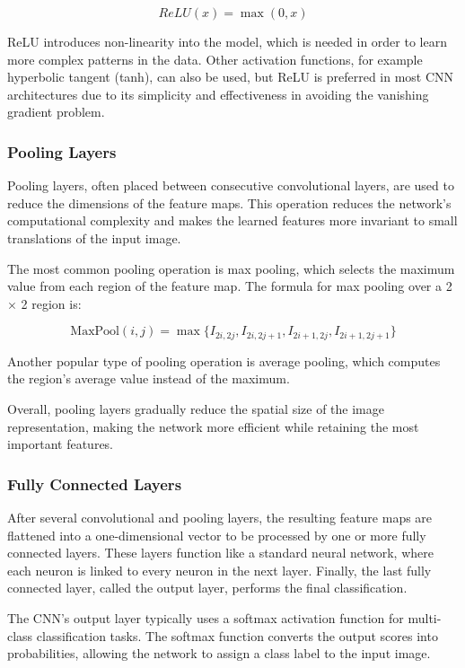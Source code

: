 \[
ReLU(x) = \max(0, x)
\]

ReLU introduces non-linearity into the model, which is needed in order to learn more complex patterns in the data. Other activation functions, for example hyperbolic tangent (tanh), can also be used, but ReLU is preferred in most CNN architectures due to its simplicity and effectiveness in avoiding the vanishing gradient problem.

\subsubsection{Pooling Layers}

Pooling layers, often placed between consecutive convolutional layers, are used to reduce the dimensions of the feature maps. This operation reduces the network's computational complexity and makes the learned features more invariant to small translations of the input image.

The most common pooling operation is max pooling, which selects the maximum value from each region of the feature map. The formula for max pooling over a 2 $\times$ 2 region is:

\[
\text{MaxPool}(i,j) = \max \{ I_{2i,2j}, I_{2i,2j+1}, I_{2i+1,2j}, I_{2i+1,2j+1} \}
\]

Another popular type of pooling operation is average pooling, which computes the region's average value instead of the maximum.

Overall, pooling layers gradually reduce the spatial size of the image representation, making the network more efficient while retaining the most important features. 

\subsubsection{Fully Connected Layers}

After several convolutional and pooling layers, the resulting feature maps are flattened into a one-dimensional vector to be processed by one or more fully connected layers. These layers function like a standard neural network, where each neuron is linked to every neuron in the next layer. Finally, the last fully connected layer, called the output layer, performs the final classification.

The CNN's output layer typically uses a softmax activation function for multi-class classification tasks. The softmax function converts the output scores into probabilities, allowing the network to assign a class label to the input image.

